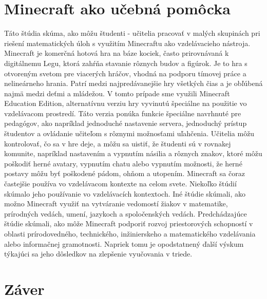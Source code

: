 \documentclass[10pt,twoside,slovak,a4paper]{article}
\begin{document}
\section{Minecraft ako učebná pomôcka} \label{dolezita}
Táto štúdia skúma, ako môžu študenti - učitelia pracovať v malých skupinách pri riešení matematických úloh s využitím Minecraftu ako vzdelávacieho nástroja. Minecraft je komerčná hotová hra na báze kociek, často prirovnávaná k digitálnemu Legu, ktorá zahŕňa stavanie rôznych budov a figúrok. Je to hra s otvoreným svetom pre viacerých hráčov, vhodná na podporu tímovej práce a nelineárneho hrania. Patrí medzi najpredávanejšie hry všetkých čias a je obľúbená najmä medzi deťmi a mládežou. V tomto prípade sme využili Minecraft Education Edition, alternatívnu verziu hry vyvinutú špeciálne na použitie vo vzdelávacom prostredí. Táto verzia ponúka funkcie špeciálne navrhnuté pre pedagógov, ako napríklad jednoduché nastavenie servera, jednoduchý prístup študentov a ovládanie učiteľom s rôznymi možnosťami uľahčenia. Učitelia môžu kontrolovať, čo sa v hre deje, a môžu sa uistiť, že študenti sú v rovnakej komunite, napríklad nastavením a vypnutím násilia a rôznych znakov, ktoré môžu poškodiť herné avatary, vypnutím chatu alebo vypnutím možnosti, že herné postavy môžu byť poškodené pádom, ohňom a utopením. Minecraft sa čoraz častejšie používa vo vzdelávacom kontexte na celom svete. Niekoľko štúdií skúmalo jeho používanie vo vzdelávacích kontextoch. Iné štúdie skúmali, ako možno Minecraft využiť na vytváranie vedomostí žiakov v matematike, prírodných vedách, umení, jazykoch a spoločenských vedách. Predchádzajúce štúdie skúmali, ako môže Minecraft podporiť rozvoj priestorových schopností v oblasti prírodovedného, technického, inžinierskeho a matematického vzdelávania alebo informačnej gramotnosti. Napriek tomu je opodstatnený ďalší výskum týkajúci sa jeho dôsledkov na zlepšenie vyučovania v triede. \cite{ANDERSEN2022100094}


\section{Záver} \label{zaver} %







\end{document}
